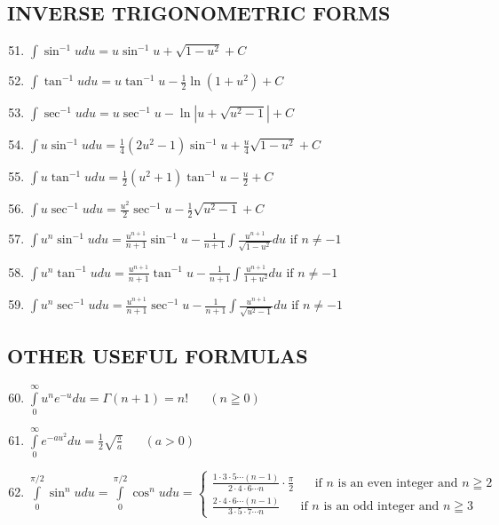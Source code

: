 \documentclass[10pt, letterpaper]{article}
\begin{document}
\subsection{INVERSE TRIGONOMETRIC FORMS}
\begin{enumerate}
	\setcounter{enumi}{50}
	\item $\int \limits \sin^{-1} u du = u \sin ^{-1} u + \sqrt{1-u^2} + C$
	\item $\int \limits \tan^{-1} u du = u \tan ^{-1} u -\frac{1}{2} \ln (1 + u^2) + C$
	\item $\int \limits \sec^{-1} u du = u \sec^{-1} u - \ln | u + \sqrt{u^2-1} | + C$
	\item $\int \limits u \sin^{-1} u du = \frac{1}{4} (2u^2-1) \sin^{-1} u + \frac{u}{4} \sqrt{1-u^2} + C$
	\item $\int \limits u \tan^{-1} u du = \frac{1}{2} (u^2+1) \tan^{-1} u - \frac{u}{2} + C$
	\item $\int \limits u \sec^{-1} u du = \frac{u^2}{2} \sec^{-1} u - \frac{1}{2} \sqrt{u^2-1} + C$
	\item $\int \limits u^n \sin^{-1} u du = \frac{u^{n+1}}{n+1} \sin^{-1} u - \frac{1}{n+1} \int \limits \frac{u^{n+1}}{\sqrt{1-u^2}} du \text{ if } n \neq -1$
	\item $\int \limits u^n \tan^{-1} u du = \frac{u^{n+1}}{n+1} \tan^{-1} u - \frac{1}{n+1} \int \limits \frac{u^{n+1}}{1+u^2} du \text{ if } n \neq -1$
	\item $\int \limits u^n \sec^{-1} u du = \frac{u^{n+1}}{n+1} \sec^{-1} u - \frac{1}{n+1} \int \limits \frac{u^{n+1}}{\sqrt{u^2-1}} du \text{ if } n \neq -1$
\end{enumerate}

\subsection{OTHER USEFUL FORMULAS}
\begin{enumerate}
	\setcounter{enumi}{59}
	\item $\int \limits_{0}^{\infty} u^n e^{-u} du = \Gamma (n+1) = n! \text{~~~~~} (n \geqq 0)$
	\item $\int \limits_{0}^{\infty} e^{-au^2} du = \frac{1}{2} \sqrt{\frac{\pi}{a}} \text{~~~~~} (a>0)$
	\item $\int \limits_{0}^{\pi / 2} \sin^n u du = \int \limits_{0}^{\pi / 2} \cos^n u du =
		\begin{cases}
		\frac{1 \cdot 3 \cdot 5 \cdots (n-1)}{2 \cdot 4 \cdot 6 \cdots n} \cdot \frac{\pi}{2} \text{~~~~~if } n \text{ is an even integer and } n \geqq 2\\
		\frac{2 \cdot 4 \cdot 6 \cdots (n-1)}{3 \cdot 5 \cdot 7 \cdots n} \text{~~~~~if } n \text{ is an odd integer and } n \geqq 3
		\end{cases}
	$
\end{enumerate}
\end{document}
